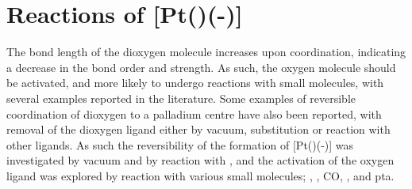 %
%



\section{Reactions of \texorpdfstring{[Pt(\tButhixantphos)(-)} P]}

The bond length of the dioxygen molecule increases upon coordination, indicating a decrease in the bond order and strength.  As such, the oxygen molecule should be activated, and more likely to undergo reactions with small molecules, with several examples reported in the literature.\cite{Choy1972, Clark1978, Goel1983b, Mimoun1980, Morvillo1986, Qu2014, Sugimoto1982, Valentine1973, Wakatsuki1990}  Some examples of reversible coordination of dioxygen to a palladium centre have also been reported, with removal of the dioxygen ligand either by vacuum, substitution or reaction with other ligands.\cite{Sergeev2010, Valentine1973, Yoshida1979}  As such the reversibility of the formation of [Pt(\tButhixantphos)(-)] was investigated by vacuum and by reaction with , and the activation of the oxygen ligand was explored by reaction with various small molecules; , , CO, ,  and \gls{pta}.

